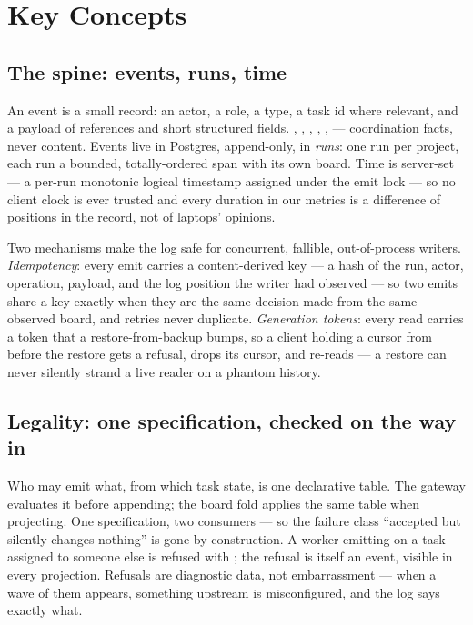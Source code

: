 \section{Key Concepts}

\subsection{The spine: events, runs, time}

An event is a small record: an actor, a role, a type, a task id where relevant, and a payload of references and short structured fields. , , , , ,  --- coordination facts, never content. Events live in Postgres, append-only, in \emph{runs}: one run per project, each run a bounded, totally-ordered span with its own board. Time is server-set --- a per-run monotonic logical timestamp assigned under the emit lock --- so no client clock is ever trusted and every duration in our metrics is a difference of positions in the record, not of laptops' opinions.

Two mechanisms make the log safe for concurrent, fallible, out-of-process writers. \emph{Idempotency}: every emit carries a content-derived key --- a hash of the run, actor, operation, payload, and the log position the writer had observed --- so two emits share a key exactly when they are the same decision made from the same observed board, and retries never duplicate. \emph{Generation tokens}: every read carries a token that a restore-from-backup bumps, so a client holding a cursor from before the restore gets a refusal, drops its cursor, and re-reads --- a restore can never silently strand a live reader on a phantom history.

\subsection{Legality: one specification, checked on the way in}

Who may emit what, from which task state, is one declarative table. The gateway evaluates it before appending; the board fold applies the same table when projecting. One specification, two consumers --- so the failure class ``accepted but silently changes nothing'' is gone by construction. A worker emitting  on a task assigned to someone else is refused with ; the refusal is itself an event, visible in every projection. Refusals are diagnostic data, not embarrassment --- when a wave of them appears, something upstream is misconfigured, and the log says exactly what.

